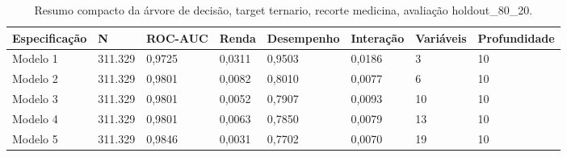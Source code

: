 \begin{table}
\caption{Resumo compacto da árvore de decisão, target ternario, recorte medicina, avaliação holdout_80_20.}
\label{tab:tabela_compacta_treeClassification_10_profundidade_ternario_recorte_medicina_holdout_80_20}
\begin{tabular}{llllllll}
\toprule
Especificação & N & ROC-AUC & Renda & Desempenho & Interação & Variáveis & Profundidade \\
\midrule
Modelo 1 & 311.329 & 0,9725 & 0,0311 & 0,9503 & 0,0186 & 3 & 10 \\
Modelo 2 & 311.329 & 0,9801 & 0,0082 & 0,8010 & 0,0077 & 6 & 10 \\
Modelo 3 & 311.329 & 0,9801 & 0,0052 & 0,7907 & 0,0093 & 10 & 10 \\
Modelo 4 & 311.329 & 0,9801 & 0,0063 & 0,7850 & 0,0079 & 13 & 10 \\
Modelo 5 & 311.329 & 0,9846 & 0,0031 & 0,7702 & 0,0070 & 19 & 10 \\
\bottomrule
\end{tabular}
\end{table}

